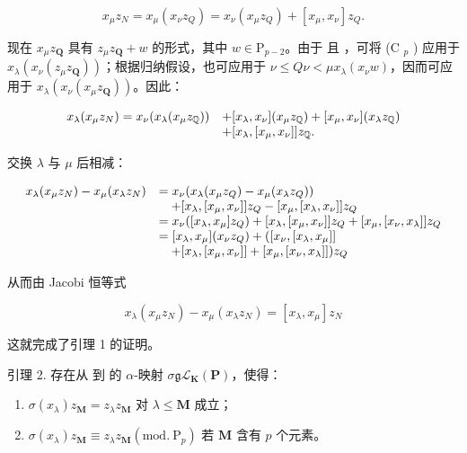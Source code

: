 \[
x _ {\mu} z _ {N} = x _ {\mu} (x _ {\nu} z _ {Q}) = x _ {\nu} (x _ {\mu} z _ {Q}) + [ x _ {\mu}, x _ {\nu} ] z _ {Q}.
\]

现在 \(x_{\mu}z_{\mathbf{Q}}\) 具有 \(z_{\mu}z_{\mathbf{Q}} + w\) 的形式，其中 \(w\in \mathrm{P}_{p - 2}\)。由于  且 ，可将 (C \(_{p}\) ) 应用于 \(x_{\lambda}(x_{\nu}(z_{\mu}z_{\mathbf{Q}}))\)；根据归纳假设，也可应用于 \(\nu \leqslant Q\)\(\nu < \mu\)\(x_{\lambda}(x_{\nu}w)\)，因而可应用于 \(x_{\lambda}(x_{\nu}(x_{\mu}z_{\mathbf{Q}}))\)。因此：

\[
\begin{array}{r l} x _ {\lambda} (x _ {\mu} z _ {N}) = x _ {\nu} (x _ {\lambda} (x _ {\mu} z _ {\mathbb {Q}})) & + [ x _ {\lambda}, x _ {\nu} ] (x _ {\mu} z _ {\mathbb {Q}}) + [ x _ {\mu}, x _ {\nu} ] (x _ {\lambda} z _ {\mathbb {Q}}) \\ & + [ x _ {\lambda}, [ x _ {\mu}, x _ {\nu} ] ] z _ {\mathbb {Q}}. \end{array}
\]

交换 \(\lambda\) 与 \(\mu\) 后相减：

\[
\begin{array}{r l} {x _ {\lambda} (x _ {\mu} z _ {N}) - x _ {\mu} (x _ {\lambda} z _ {N})} & {= x _ {\nu} (x _ {\lambda} (x _ {\mu} z _ {Q}) - x _ {\mu} (x _ {\lambda} z _ {Q}))} \\ & {\quad + [ x _ {\lambda}, [ x _ {\mu}, x _ {\nu} ] ] z _ {Q} - [ x _ {\mu}, [ x _ {\lambda}, x _ {\nu} ] ] z _ {Q}} \\ & {= x _ {\nu} ([ x _ {\lambda}, x _ {\mu} ] z _ {Q}) + [ x _ {\lambda}, [ x _ {\mu}, x _ {\nu} ] ] z _ {Q} + [ x _ {\mu}, [ x _ {\nu}, x _ {\lambda} ] ] z _ {Q}} \\ & {= [ x _ {\lambda}, x _ {\mu} ] (x _ {\nu} z _ {Q}) + ([ x _ {\nu}, [ x _ {\lambda}, x _ {\mu} ] ]} \\ & {\quad + [ x _ {\lambda}, [ x _ {\mu}, x _ {\nu} ] ] + [ x _ {\mu}, [ x _ {\nu}, x _ {\lambda} ] ]) z _ {Q}} \end{array}
\]

从而由 Jacobi 恒等式

\[
x _ {\lambda} (x _ {\mu} z _ {N}) - x _ {\mu} (x _ {\lambda} z _ {N}) = [ x _ {\lambda}, x _ {\mu} ] z _ {N}
\]

这就完成了引理 1 的证明。

引理 2. 存在从  到  的 \(\alpha\)-映射 \(\sigma\)\(\mathfrak{g}\)\(\mathcal{L}_{\mathbf{K}}(\mathbf{P})\)，使得：

\begin{enumerate}
\def\labelenumi{(\arabic{enumi})}
\item
  \(\sigma(x_{\lambda})z_{\mathbf{M}} = z_{\lambda}z_{\mathbf{M}}\) 对 \(\lambda \leqslant \mathbf{M}\) 成立；
\item
  \(\sigma(x_{\lambda})z_{\mathbf{M}} \equiv z_{\lambda}z_{\mathbf{M}} (\mathrm{mod.~P}_{p})\) 若 \(\mathbf{M}\) 含有 \(p\) 个元素。
\end{enumerate}

